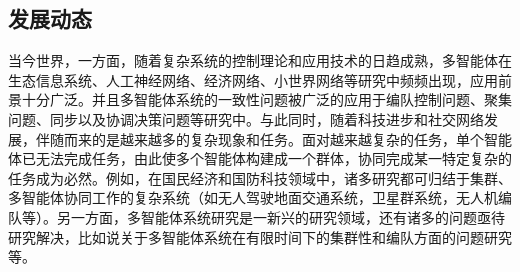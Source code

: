 \subsection{发展动态}

当今世界，一方面，随着复杂系统的控制理论和应用技术的日趋成熟，多智能体在生态信息系统、人工神经网络、经济网络、小世界网络等研究中频频出现，应用前景十分广泛。并且多智能体系统的一致性问题被广泛的应用于编队控制问题、聚集问题、同步以及协调决策问题等研究中。与此同时，随着科技进步和社交网络发展，伴随而来的是越来越多的复杂现象和任务。面对越来越复杂的任务，单个智能体已无法完成任务，由此使多个智能体构建成一个群体，协同完成某一特定复杂的任务成为必然。例如，在国民经济和国防科技领域中，诸多研究都可归结于集群、多智能体协同工作的复杂系统（如无人驾驶地面交通系统，卫星群系统，无人机编队等）。另一方面，多智能体系统研究是一新兴的研究领域，还有诸多的问题亟待研究解决，比如说关于多智能体系统在有限时间下的集群性和编队方面的问题研究等。